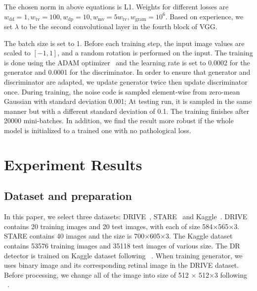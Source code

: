 \documentclass[letterpaper]{article} %
\begin{document}
	The chosen norm in above equations is L1.  Weights for different losses are $ w_\mathrm{dd} = 1, w_\mathrm{tv} = 100, w_\mathrm{dp} = 10, w_\mathrm{mv} = 5 w_\mathrm{tv}, w_\mathrm{gram} = 10^6 $. Based on experience, we set $ \lambda $ to be the second convolutional layer in the fourth block of VGG.

	The batch size is set to 1. Before each training step, the input image values are scaled to $[-1, 1]$, and a random rotation is performed on the input.
	The training is done using the ADAM optimizer~\cite{kingma2014adam} and the learning rate is set to 0.0002 for the generator and 0.0001 for the discriminator. In order to ensure that generator and discriminator are adapted, we update generator twice then update discriminator once. During training, the noise code is sampled element-wise from zero-mean Gaussian with standard deviation 0.001; At testing run, it is sampled in the same manner but with a different standard deviation of 0.1.
	The training finishes after 20000 mini-batches. In addition, we find the result more robust if the whole model is initialized to a trained one with no pathological loss.




	\section{Experiment Results}

	\subsection{Dataset and preparation}
	In this paper, we select three datasets: DRIVE~\cite{staal:2004-855}, STARE~\cite{hoover2000locating} and Kaggle~\cite{kaggle2016diabetic}.
	DRIVE contains 20 training images and 20 test images, with each of size 584$\times$565$\times$3. STARE contains 40  images and the size is 700$\times$605$\times$3. The Kaggle dataset contains 53576 training images and 35118 test images of various size. The DR detector is trained on Kaggle dataset following ~\cite{oO2016detector}. When training generator, we uses binary image and its corresponding retinal image in the DRIVE dataset. Before processing, we change all of the image into size of 512 $\times$ 512$\times$3 following ~\cite{zhao2018synthesizing}.%
\end{document}
